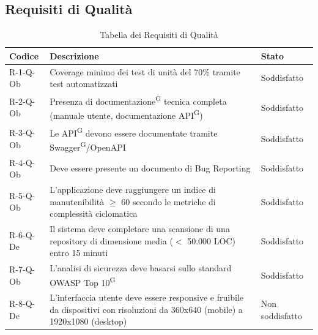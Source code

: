 \documentclass[a4paper, 11pt]{article}
\renewcommand{\arraystretch}{1.4}
\begin{document}
\subsection{Requisiti di Qualità}
\renewcommand{\arraystretch}{1.5}
\begin{longtable}[c]{ >{\centering\arraybackslash}m{2.5cm} >{\centering\arraybackslash}m{8.3cm} >{\centering\arraybackslash}m{3.5cm} }
    \caption{Tabella dei Requisiti di Qualità} \\
    \rowcolor{AccentDark}
    \color{white}\textbf{Codice} & \color{white}\textbf{Descrizione} & \color{white}\textbf{Stato} \\
    \endhead
    R-1-Q-Ob & Coverage minimo dei test di unità del 70\% tramite test automatizzati & Soddisfatto \\
    R-2-Q-Ob & Presenza di documentazione\textsuperscript{G} tecnica completa (manuale utente, documentazione API\textsuperscript{G}) & Soddisfatto \\
    R-3-Q-Ob & Le API\textsuperscript{G} devono essere documentate tramite Swagger\textsuperscript{G}/OpenAPI & Soddisfatto \\
    R-4-Q-Ob & Deve essere presente un documento di Bug Reporting & Soddisfatto \\
    R-5-Q-Ob & L'applicazione deve raggiungere un indice di manutenibilità $\geq$ 60 secondo le metriche di complessità ciclomatica & Soddisfatto \\
    R-6-Q-De & Il sistema deve completare una scansione di una repository di dimensione media ($<$ 50.000 LOC) entro 15 minuti & Soddisfatto \\
    R-7-Q-Ob & L'analisi di sicurezza deve basarsi sullo standard OWASP Top 10\textsuperscript{G} & Soddisfatto \\
    R-8-Q-De & L'interfaccia utente deve essere responsive e fruibile da dispositivi con risoluzioni da 360x640 (mobile) a 1920x1080 (desktop) & Non soddisfatto \\
\end{longtable}
\end{document}
